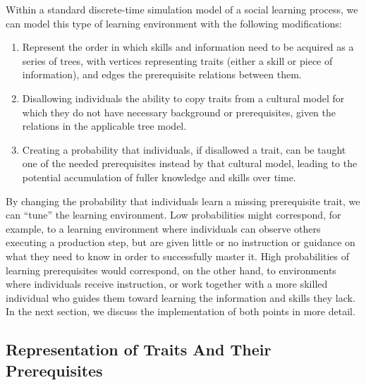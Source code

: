 \documentclass[graybox,natbib]{svmult}
\begin{document}
Within a standard discrete-time simulation model of a social learning
process, we can model this type of learning environment with the
following modifications:

\begin{enumerate}
\def\labelenumi{\arabic{enumi}.}
\itemsep1pt\parskip0pt
\item
  Represent the order in which skills and information need to be
  acquired as a series of trees, with vertices representing traits
  (either a skill or piece of information), and edges the prerequisite
  relations between them.
\item
  Disallowing individuals the ability to copy traits from a cultural
  model for which they do not have necessary background or
  prerequisites, given the relations in the applicable tree model.
\item
  Creating a probability that individuals, if disallowed a trait, can be
  taught one of the needed prerequisites instead by that cultural model,
  leading to the potential accumulation of fuller knowledge and skills
  over time.
\end{enumerate}

By changing the probability that individuals learn a missing
prerequisite trait, we can ``tune'' the learning environment. Low
probabilities might correspond, for example, to a learning environment
where individuals can observe others executing a production step, but
are given little or no instruction or guidance on what they need to know
in order to successfully master it. High probabilities of learning
prerequisites would correspond, on the other hand, to environments where
individuals receive instruction, or work together with a more skilled
individual who guides them toward learning the information and skills
they lack. In the next section, we discuss the implementation of both
points in more detail.

\subsection{Representation of Traits And Their
Prerequisites}\label{representation-of-traits-and-their-prerequisites}
\end{document}
